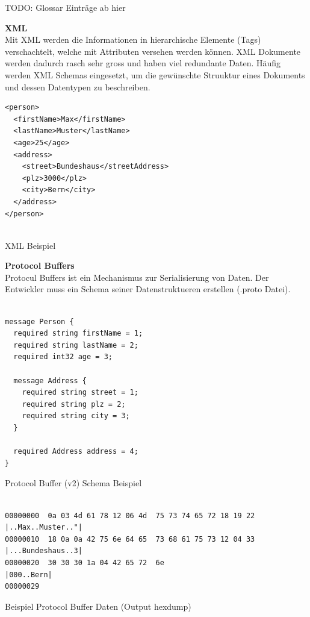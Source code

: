 TODO: Glossar Einträge ab hier

\textbf{XML} \\
Mit XML werden die Informationen in hierarchische Elemente (Tags) verschachtelt, welche mit Attributen versehen werden können. XML Dokumente werden dadurch rasch sehr gross und haben viel redundante Daten. Häufig werden XML Schemas eingesetzt, um die gewünschte Struuktur eines Dokuments und dessen Datentypen zu beschreiben.

\begin{listing}[H]
\begin{verbatim}
<person>
  <firstName>Max</firstName>
  <lastName>Muster</lastName>
  <age>25</age>
  <address>
    <street>Bundeshaus</streetAddress>
    <plz>3000</plz>
    <city>Bern</city>
  </address>
</person>


\end{verbatim}
\caption{XML Beispiel}
\end{listing}



\textbf{Protocol Buffers} \\
Protocul Buffers ist ein Mechanismus zur Serialisierung von Daten. Der Entwickler muss ein Schema seiner Datenstruktueren erstellen (.proto Datei).

\begin{listing}[H]
\begin{verbatim}

message Person {
  required string firstName = 1;
  required string lastName = 2;
  required int32 age = 3;

  message Address {
    required string street = 1;
    required string plz = 2;
    required string city = 3;
  }
  
  required Address address = 4;
}

\end{verbatim}
\caption{Protocol Buffer (v2) Schema Beispiel}
\end{listing}


\begin{listing}[H]
\begin{verbatim}
               
00000000  0a 03 4d 61 78 12 06 4d  75 73 74 65 72 18 19 22  |..Max..Muster.."|
00000010  18 0a 0a 42 75 6e 64 65  73 68 61 75 73 12 04 33  |...Bundeshaus..3|
00000020  30 30 30 1a 04 42 65 72  6e                       |000..Bern|
00000029

\end{verbatim}
\caption{Beispiel Protocol Buffer Daten (Output hexdump)}
\end{listing}


